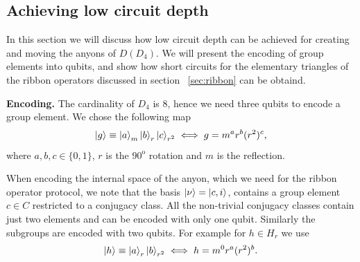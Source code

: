 \documentclass[two column]{article}
\newcommand{\caro}[1]{\textcolor{red}{[#1]}}
\begin{document}

\subsection{Achieving low circuit depth}\label{subsec:enc}

In this section we will discuss how low circuit depth can be achieved for creating and moving the anyons of $D(D_4)$. We will present the encoding of group elements into qubits, and show how short circuits for the elementary triangles of the ribbon operators discussed in section ~\ref{sec:ribbon} can be obtaind.

\textbf{Encoding.} 
The cardinality of $D_4$ is 8, hence we need three qubits to encode a group element.
We chose the following map
\begin{equation}
    \ket{g} \equiv \ket{a}_m\ket{b}_r\ket{c}_{r^2} \iff g = m^a r^b (r^2)^c,
\end{equation}
where $a,b,c \in \{0,1\}$, $r$ is the $90^{\text{o}}$ rotation and $m$ is the reflection.

When encoding the internal space of the anyon, which we need for the ribbon operator protocol, we note that the basis $\ket{\nu} = \ket{c, i}$, contains a group element $c\in C$ restricted to a conjugacy class. All the non-trivial conjugacy classes contain just two elements and can be encoded with only one qubit. Similarly the subgroups are encoded with two qubits. For example for $h\in H_r$ we use\begin{equation}
    \ket{h} \equiv \ket{a}_r\ket{b}_{r^2} \iff h = m^0r^a(r^2)^b.
\end{equation}
%
\end{document}
